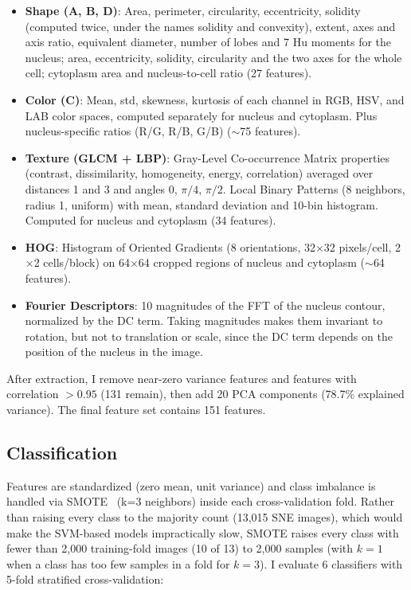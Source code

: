 \documentclass[twocolumn,a4paper]{article}
\begin{document}
\begin{itemize}
    \item \textbf{Shape (A, B, D)}: Area, perimeter, circularity, eccentricity, solidity (computed twice, under the names solidity and convexity), extent, axes and axis ratio, equivalent diameter, number of lobes and 7 Hu moments for the nucleus; area, eccentricity, solidity, circularity and the two axes for the whole cell; cytoplasm area and nucleus-to-cell ratio (27 features).
    \item \textbf{Color (C)}: Mean, std, skewness, kurtosis of each channel in RGB, HSV, and LAB color spaces, computed separately for nucleus and cytoplasm. Plus nucleus-specific ratios (R/G, R/B, G/B) ($\sim$75 features).
    \item \textbf{Texture (GLCM + LBP)}: Gray-Level Co-occurrence Matrix properties (contrast, dissimilarity, homogeneity, energy, correlation) averaged over distances 1 and 3 and angles 0, $\pi/4$, $\pi/2$. Local Binary Patterns (8 neighbors, radius 1, uniform) with mean, standard deviation and 10-bin histogram. Computed for nucleus and cytoplasm (34 features).
    \item \textbf{HOG}: Histogram of Oriented Gradients (8 orientations, 32$\times$32 pixels/cell, 2$\times$2 cells/block) on 64$\times$64 cropped regions of nucleus and cytoplasm ($\sim$64 features).
    \item \textbf{Fourier Descriptors}: 10 magnitudes of the FFT of the nucleus contour, normalized by the DC term. Taking magnitudes makes them invariant to rotation, but not to translation or scale, since the DC term depends on the position of the nucleus in the image.
\end{itemize}

After extraction, I remove near-zero variance features and features with correlation $> 0.95$ (131 remain), then add 20 PCA components (78.7\% explained variance). The final feature set contains 151 features.

\subsection{Classification}

Features are standardized (zero mean, unit variance) and class imbalance is handled via SMOTE~\cite{chawla2002smote} (k=3 neighbors) inside each cross-validation fold. Rather than raising every class to the majority count (13,015 SNE images), which would make the SVM-based models impractically slow, SMOTE raises every class with fewer than 2,000 training-fold images (10 of 13) to 2,000 samples (with $k=1$ when a class has too few samples in a fold for $k=3$). I evaluate 6 classifiers with 5-fold stratified cross-validation:
\end{document}
